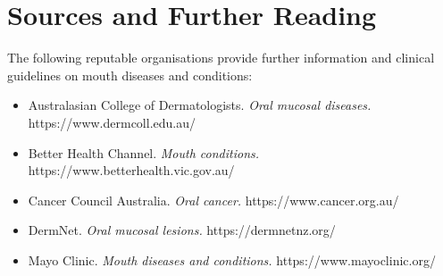 \section*{Sources and Further Reading}
The following reputable organisations provide further information and clinical guidelines on mouth diseases and conditions:
\begin{itemize}
    \item Australasian College of Dermatologists. \textit{Oral mucosal diseases.} https://www.dermcoll.edu.au/
    \item Better Health Channel. \textit{Mouth conditions.} https://www.betterhealth.vic.gov.au/
    \item Cancer Council Australia. \textit{Oral cancer.} https://www.cancer.org.au/
    \item DermNet. \textit{Oral mucosal lesions.} https://dermnetnz.org/
    \item Mayo Clinic. \textit{Mouth diseases and conditions.} https://www.mayoclinic.org/
\end{itemize}
